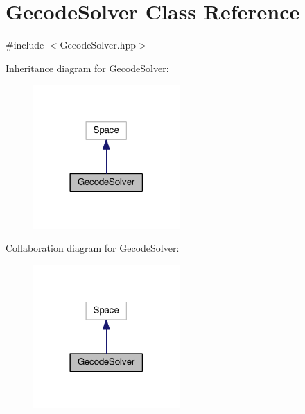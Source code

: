 \hypertarget{class_gecode_solver}{\section{Gecode\-Solver Class Reference}
\label{class_gecode_solver}
}


{\ttfamily \#include $<$Gecode\-Solver.\-hpp$>$}



Inheritance diagram for Gecode\-Solver\-:\nopagebreak
\begin{figure}[H]
\begin{center}
\leavevmode
\includegraphics[width=158pt]{class_gecode_solver__inherit__graph}
\end{center}
\end{figure}


Collaboration diagram for Gecode\-Solver\-:\nopagebreak
\begin{figure}[H]
\begin{center}
\leavevmode
\includegraphics[width=158pt]{class_gecode_solver__coll__graph}
\end{center}
\end{figure}

